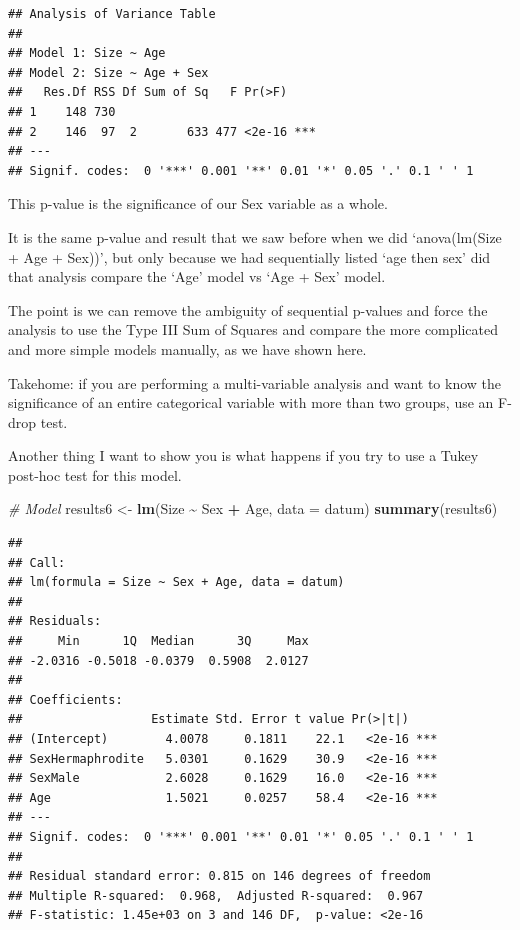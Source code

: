 \documentclass[
]{article}
\newenvironment{Shaded}{\begin{snugshade}}{\end{snugshade}}
\newcommand{\AttributeTok}[1]{\textcolor[rgb]{0.13,0.29,0.53}{#1}}
\newcommand{\CommentTok}[1]{\textcolor[rgb]{0.56,0.35,0.01}{\textit{#1}}}
\newcommand{\FunctionTok}[1]{\textcolor[rgb]{0.13,0.29,0.53}{\textbf{#1}}}
\newcommand{\NormalTok}[1]{#1}
\newcommand{\OtherTok}[1]{\textcolor[rgb]{0.56,0.35,0.01}{#1}}
\newcommand{\SpecialCharTok}[1]{\textcolor[rgb]{0.81,0.36,0.00}{\textbf{#1}}}
\begin{document}
\begin{verbatim}
## Analysis of Variance Table
## 
## Model 1: Size ~ Age
## Model 2: Size ~ Age + Sex
##   Res.Df RSS Df Sum of Sq   F Pr(>F)    
## 1    148 730                            
## 2    146  97  2       633 477 <2e-16 ***
## ---
## Signif. codes:  0 '***' 0.001 '**' 0.01 '*' 0.05 '.' 0.1 ' ' 1
\end{verbatim}

This p-value is the significance of our Sex variable as a whole.

It is the same p-value and result that we saw before when we did
`anova(lm(Size + Age + Sex))', but only because we had sequentially
listed `age then sex' did that analysis compare the `Age' model vs `Age
+ Sex' model.

The point is we can remove the ambiguity of sequential p-values and
force the analysis to use the Type III Sum of Squares and compare the
more complicated and more simple models manually, as we have shown here.

Takehome: if you are performing a multi-variable analysis and want to
know the significance of an entire categorical variable with more than
two groups, use an F-drop test.

Another thing I want to show you is what happens if you try to use a
Tukey post-hoc test for this model.

\begin{Shaded}
\begin{Highlighting}[]
\CommentTok{\# Model}
\NormalTok{results6 }\OtherTok{\textless{}{-}} \FunctionTok{lm}\NormalTok{(Size }\SpecialCharTok{\textasciitilde{}}\NormalTok{ Sex }\SpecialCharTok{+}\NormalTok{ Age, }\AttributeTok{data =}\NormalTok{ datum)}
\FunctionTok{summary}\NormalTok{(results6)}
\end{Highlighting}
\end{Shaded}

\begin{verbatim}
## 
## Call:
## lm(formula = Size ~ Sex + Age, data = datum)
## 
## Residuals:
##     Min      1Q  Median      3Q     Max 
## -2.0316 -0.5018 -0.0379  0.5908  2.0127 
## 
## Coefficients:
##                  Estimate Std. Error t value Pr(>|t|)    
## (Intercept)        4.0078     0.1811    22.1   <2e-16 ***
## SexHermaphrodite   5.0301     0.1629    30.9   <2e-16 ***
## SexMale            2.6028     0.1629    16.0   <2e-16 ***
## Age                1.5021     0.0257    58.4   <2e-16 ***
## ---
## Signif. codes:  0 '***' 0.001 '**' 0.01 '*' 0.05 '.' 0.1 ' ' 1
## 
## Residual standard error: 0.815 on 146 degrees of freedom
## Multiple R-squared:  0.968,  Adjusted R-squared:  0.967 
## F-statistic: 1.45e+03 on 3 and 146 DF,  p-value: <2e-16
\end{verbatim}
\end{document}
